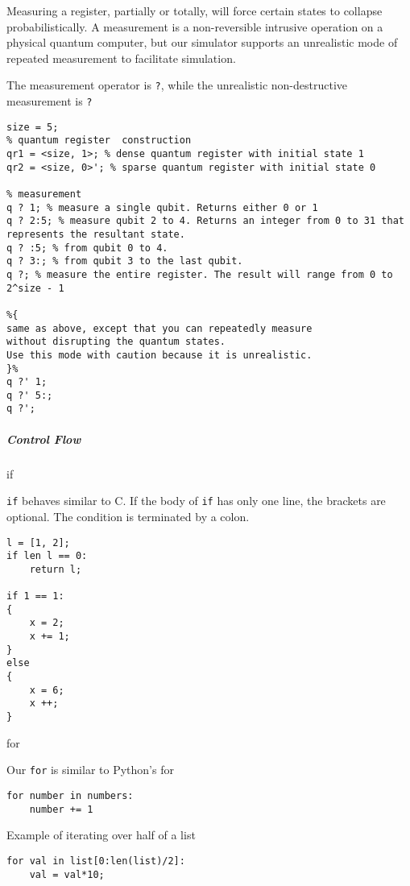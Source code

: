 \documentclass[]{article}
\begin{document}
Measuring a register, partially or totally, will force certain states to
collapse probabilistically. A measurement is a non-reversible intrusive
operation on a physical quantum computer, but our simulator supports an
unrealistic mode of repeated measurement to facilitate simulation.

The measurement operator is \texttt{?}, while the unrealistic
non-destructive measurement is \texttt{?\textquotesingle{}}

\begin{verbatim}
size = 5;
% quantum register  construction
qr1 = <size, 1>; % dense quantum register with initial state 1
qr2 = <size, 0>'; % sparse quantum register with initial state 0

% measurement
q ? 1; % measure a single qubit. Returns either 0 or 1
q ? 2:5; % measure qubit 2 to 4. Returns an integer from 0 to 31 that represents the resultant state.
q ? :5; % from qubit 0 to 4.
q ? 3:; % from qubit 3 to the last qubit. 
q ?; % measure the entire register. The result will range from 0 to 2^size - 1

%{
same as above, except that you can repeatedly measure 
without disrupting the quantum states. 
Use this mode with caution because it is unrealistic.
}%
q ?' 1;
q ?' 5:;
q ?';
\end{verbatim}

\subparagraph{Control Flow}\label{control-flow}

if

\texttt{if} behaves similar to C. If the body of \texttt{if} has only
one line, the brackets are optional. The condition is terminated by a
colon.

\begin{verbatim}
l = [1, 2];
if len l == 0:
    return l;

if 1 == 1:
{
    x = 2;
    x += 1;
}
else
{
    x = 6;
    x ++;
}
\end{verbatim}

for

Our \texttt{for} is similar to Python's for

\begin{verbatim}
for number in numbers:
    number += 1
\end{verbatim}

Example of iterating over half of a list

\begin{verbatim}
for val in list[0:len(list)/2]:
    val = val*10;
\end{verbatim}
\end{document}
